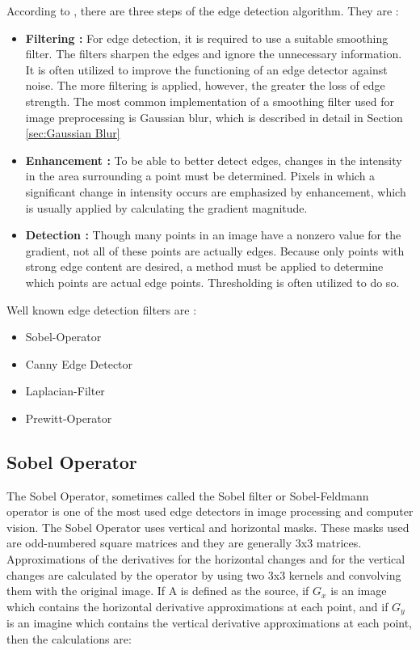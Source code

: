 According to \cite{Machine_Vision}, there are three steps of the edge detection algorithm. They are :

\begin{itemize}

\item \textbf{Filtering : } For edge detection, it is required to use a suitable smoothing filter. The filters sharpen the edges and ignore the unnecessary information. It is often utilized to improve the functioning of an edge detector against noise. The more filtering is applied, however, the greater the loss of edge strength. The most common implementation of a smoothing filter used for image preprocessing is Gaussian blur, which is described in detail in Section \ref{sec:Gaussian Blur}   
 
\item \textbf{Enhancement : } To be able to better detect edges, changes in the intensity in the area surrounding a point must be determined. Pixels in which a significant change in intensity occurs are emphasized by enhancement, which is usually applied by calculating the gradient magnitude.
  
\item \textbf{Detection : } Though many points in an image have a nonzero value for the gradient, not all of these points are actually edges. Because only points with strong edge content are desired, a method must be applied to determine which points are actual edge points. Thresholding is often utilized to do so.
 
\end{itemize}

Well known edge detection filters are :

\begin{itemize}

 \item Sobel-Operator
 \item Canny Edge Detector
 \item Laplacian-Filter
 \item Prewitt-Operator
 
 \end{itemize}


%
\subsection{Sobel Operator}\label{sec:Sobel Operator}

The Sobel Operator, sometimes called the Sobel filter or Sobel-Feldmann operator is one of the most used edge detectors in image processing and computer vision. The Sobel Operator uses vertical and horizontal masks. These masks used are odd-numbered square matrices and they are generally 3x3 matrices. Approximations of the derivatives for the horizontal changes and for the vertical changes are calculated by the operator by using two 3x3 kernels and convolving them with the original image. If A is defined as the source, if $G_{x}$ is an image which contains the horizontal derivative approximations at each point, and if $G_{y}$ is an imagine which contains the vertical derivative approximations at each point, then the calculations are:


